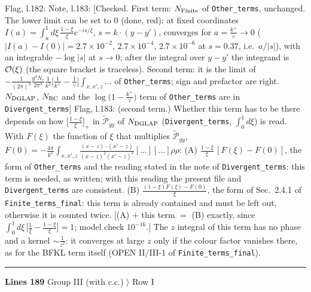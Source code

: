 \documentclass[10pt]{article}
\newenvironment{notebox}{\def\FrameCommand{{\color{notebar}\vrule width 1.5pt}\hspace{6pt}}\MakeFramed{\advance\hsize-\width\FrameRestore}\small}{\endMakeFramed}
\begin{document}
\begin{notebox}\textsf{\small Flag, l.182:} \end{notebox}
\begin{notebox}\textsf{\small Note, l.183:} [Checked. First term: $N_{\rm Finite}$ of \texttt{Other\_terms}, unchanged. The lower limit can be set to $0$ (done, red): at fixed coordinates $I(a)=\int_{a}^{1}d\xi\,\frac{1-\xi}{\xi}e^{-is/\xi}$, $s=k\cdot(y-y')$, converges for $a=\frac{k^{+}}{\vee}\to0$ ($|I(a)-I(0)|=2.7\times10^{-2}$, $2.7\times10^{-4}$, $2.7\times10^{-6}$ at $s=0.37$, i.e.\ $a/|s|$), with an integrable $-\log|s|$ at $s\to0$; after the integral over $y-y'$ the integrand is ${\cal O}(\xi)$ (the square bracket is traceless). Second term: it is the limit of $-\frac{1}{(2\pi)^{3}}\frac{g^{4}N_{c}}{2\pi^{3}}\frac{1}{k^{2}}\big[\frac{1}{k^{+}}-\frac{1}{\vee}\big]\int_{x,x',z}\dots$ of \texttt{Other\_terms}; sign and prefactor are right. $N_{\rm DGLAP}$, $N_{\rm RC}$ and the $\log\big(1-\frac{k^{+}}{\vee}\big)$ term of \texttt{Other\_terms} are in \texttt{Divergent\_terms}]\end{notebox}
\begin{notebox}\textsf{\small Flag, l.183:}  (second term.) Whether this term has to be there depends on how $\big[\frac{1-\xi}{\xi}\big]_{+}$ in $\widetilde{\mathcal{P}}_{gg}$ of $N_{\rm DGLAP}$ (\texttt{Divergent\_terms}, $\int_{0}^{1}d\xi$) is read. With $F(\xi)$ the function of $\xi$ that multiplies $\widetilde{\mathcal{P}}_{gg}$, $F(0)=-\frac{4\pi}{k^{2}}\int_{x,x',z}\frac{(x-z)\cdot(x'-z)}{(x-z)^{2}(x'-z)^{2}}[\dots][\dots]\rho\rho$: (A) $\frac{1-\xi}{\xi}\,[F(\xi)-F(0)]$, the form of \texttt{Other\_terms} and the reading stated in the note of \texttt{Divergent\_terms}: this term is needed, as written; with this reading the present file and \texttt{Divergent\_terms} are consistent. (B) $\frac{(1-\xi)F(\xi)-F(0)}{\xi}$, the form of Sec.~2.4.1 of \texttt{Finite\_terms\_final}: this term is already contained and must be left out, otherwise it is counted twice. [(A) $+$ this term $=$ (B) exactly, since $\int_{0}^{1}d\xi\,\big[\frac{1}{\xi}-\frac{1-\xi}{\xi}\big]=1$; model check $10^{-16}$.] The $z$ integral of this term has no phase and a kernel $\sim\frac{1}{z^{2}}$: it converges at large $z$ only if the colour factor vanishes there, as for the BFKL term itself (OPEN II/III-1 of \texttt{Finite\_terms\_final}).\end{notebox}
\noindent\rule{\linewidth}{0.3pt}\par\noindent\textbf{Lines 189} \quad \textsf{Group III (with c.c.) $\rangle$ Row I}\par
\end{document}
